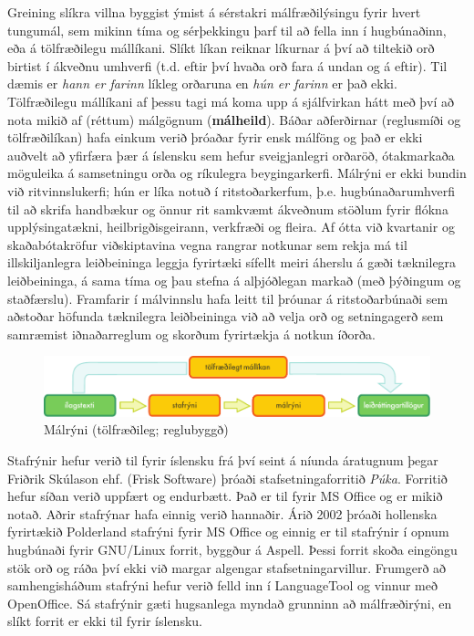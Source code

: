 \documentclass{../../metanetpaper}
\begin{document}
\begin{multicols}{2}
Greining slíkra villna byggist ýmist á sérstakri málfræðilýsingu fyrir hvert tungumál, sem mikinn tíma og sérþekkingu þarf til að fella inn í hugbúnaðinn, eða á tölfræðilegu mállíkani. Slíkt líkan reiknar líkurnar á því að tiltekið orð birtist í ákveðnu umhverfi (t.d. eftir því hvaða orð fara á undan og á eftir). Til dæmis er \textit{hann er farinn} líkleg orðaruna en \textit{hún er farinn} er það ekki. Tölfræðilegu mállíkani af þessu tagi má koma upp á sjálfvirkan hátt með því að nota mikið af (réttum) málgögnum (\textbf{málheild}). Báðar aðferðirnar (reglusmíði og tölfræðilíkan) hafa einkum verið þróaðar fyrir ensk málföng og það er ekki auðvelt að yfirfæra þær á íslensku sem hefur sveigjanlegri orðaröð, ótakmarkaða möguleika á samsetningu orða og ríkulegra beygingarkerfi.  Málrýni er ekki bundin við ritvinnslukerfi; hún er líka notuð í ritstoðarkerfum, þ.e. hugbúnaðarumhverfi til að skrifa handbækur og önnur rit samkvæmt ákveðnum stöðlum fyrir flókna upplýsingatækni, heilbrigðisgeirann, verkfræði og fleira. Af ótta við kvartanir og skaðabótakröfur viðskiptavina vegna rangrar notkunar sem rekja má til illskiljanlegra leiðbeininga leggja fyrirtæki sífellt meiri áherslu á gæði tæknilegra leiðbeininga, á sama tíma og þau stefna á alþjóðlegan markað (með þýðingum og staðfærslu). Framfarir í málvinnslu hafa leitt til þróunar á ritstoðarbúnaði sem aðstoðar höfunda tæknilegra leiðbeininga við að velja orð og setningagerð sem samræmist iðnaðarreglum og skorðum fyrirtækja á notkun íðorða.

\begin{figure}[htb]
  \center
  \includegraphics[width=\textwidth]{../_media/icelandic/language_checking}
  \caption{Málrýni (tölfræðileg; reglubyggð)}
  \label{fig:langcheckingaarch_is}
\end{figure}

Stafrýnir hefur verið til fyrir íslensku frá því seint á níunda áratugnum þegar Friðrik Skúlason ehf. (Frisk Software) þróaði stafsetningaforritið \textit{Púka}. Forritið hefur síðan verið uppfært og endurbætt. Það er til fyrir MS Office og er mikið notað. Aðrir stafrýnar hafa einnig verið hannaðir. Árið 2002 þróaði hollenska fyrirtækið Polderland stafrýni fyrir MS Office og einnig er til stafrýnir í opnum hugbúnaði fyrir GNU/Linux forrit, byggður á Aspell. Þessi forrit skoða eingöngu stök orð og ráða því ekki við margar algengar stafsetningarvillur. Frumgerð að samhengisháðum stafrýni hefur verið felld inn í LanguageTool\cite{lto1} og vinnur með OpenOffice. Sá stafrýnir gæti hugsanlega myndað grunninn að málfræðirýni, en slíkt forrit er ekki til fyrir íslensku. 


\end{multicols}
\end{document}

